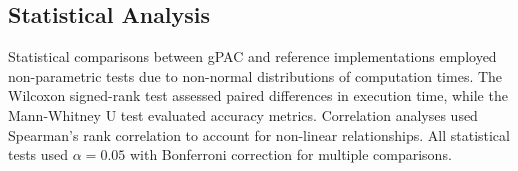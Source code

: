 \subsection{Statistical Analysis}
Statistical comparisons between gPAC and reference implementations employed non-parametric tests due to non-normal distributions of computation times. The Wilcoxon signed-rank test assessed paired differences in execution time, while the Mann-Whitney U test evaluated accuracy metrics. Correlation analyses used Spearman's rank correlation to account for non-linear relationships. All statistical tests used $\alpha = 0.05$ with Bonferroni correction for multiple comparisons.

\label{sec:methods}